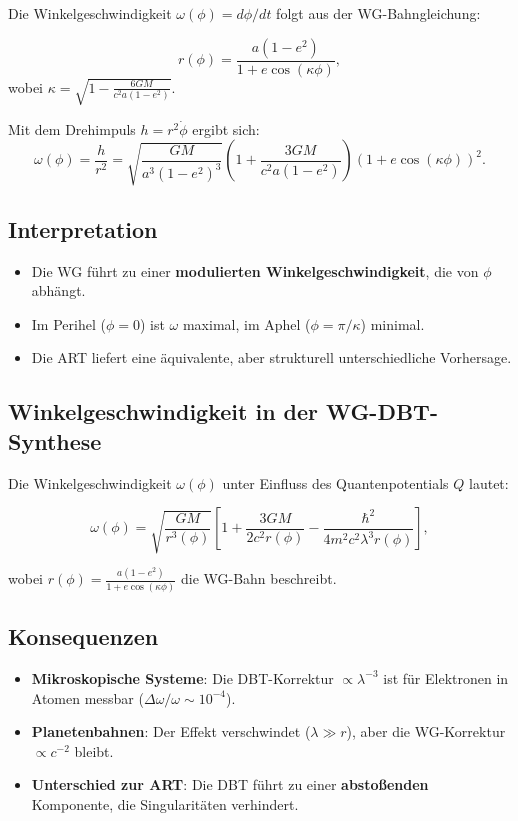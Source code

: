 Die Winkelgeschwindigkeit $\omega(\phi) = d\phi/dt$ folgt aus der WG-Bahngleichung:

\begin{equation}
r(\phi) = \frac{a(1 - e^2)}{1 + e \cos(\kappa \phi)},
\end{equation}
wobei $\kappa = \sqrt{1 - \frac{6GM}{c^2 a (1 - e^2)}}$. 

Mit dem Drehimpuls $h = r^2 \dot{\phi}$ ergibt sich:
\begin{equation}
\omega(\phi) = \frac{h}{r^2} = \sqrt{\frac{GM}{a^3 (1 - e^2)^3}} \left(1 + \frac{3GM}{c^2 a (1 - e^2)}\right) \left(1 + e \cos(\kappa \phi)\right)^2.
\end{equation}

\subsection*{Interpretation}
\begin{itemize}
\item Die WG führt zu einer \textbf{modulierten Winkelgeschwindigkeit}, die von $\phi$ abhängt.
\item Im Perihel ($\phi = 0$) ist $\omega$ maximal, im Aphel ($\phi = \pi/\kappa$) minimal.
\item Die ART liefert eine äquivalente, aber strukturell unterschiedliche Vorhersage.
\end{itemize}

\subsection{Winkelgeschwindigkeit in der WG-DBT-Synthese}  
\label{sec:omega_dbt}  

Die Winkelgeschwindigkeit $\omega(\phi)$ unter Einfluss des Quantenpotentials $Q$ lautet:  

\begin{equation}  
\omega(\phi) = \sqrt{\frac{GM}{r^3(\phi)}} \left[1 + \frac{3GM}{2c^2 r(\phi)} - \frac{\hbar^2}{4m^2 c^2 \lambda^3 r(\phi)}\right],  
\end{equation}  

wobei $r(\phi) = \frac{a(1-e^2)}{1 + e \cos(\kappa \phi)}$ die WG-Bahn beschreibt.  

\subsection*{Konsequenzen}  
\begin{itemize}  
\item \textbf{Mikroskopische Systeme}: Die DBT-Korrektur $\propto \lambda^{-3}$ ist für Elektronen in Atomen messbar ($\Delta \omega/\omega \sim 10^{-4}$).  
\item \textbf{Planetenbahnen}: Der Effekt verschwindet ($\lambda \gg r$), aber die WG-Korrektur $\propto c^{-2}$ bleibt.  
\item \textbf{Unterschied zur ART}: Die DBT führt zu einer \textbf{abstoßenden} Komponente, die Singularitäten verhindert.  
\end{itemize}
